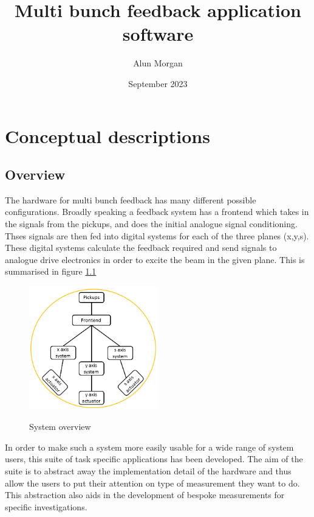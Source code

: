 \documentclass{report}
\newcommand{\docTitle}{Multi bunch feedback application software}
\begin{document}
\title{\docTitle}
\author{Alun Morgan}
\date{September 2023}

\maketitle

\tableofcontents
\clearpage
\chapter{Conceptual descriptions}
\section{Overview}
The hardware for multi bunch feedback has many different possible configurations. Broadly speaking a feedback system has a frontend which takes in the signals from the pickups, and does the initial analogue signal conditioning. Thses signals are then fed into digital systems for each of the three planes (x,y,s). These digital systems calculate the feedback required and send signals to analogue drive electronics in order to excite the beam in the given plane. This is summarised in figure \ref{system_overview}

\begin{figure}[hbt]
\begin{center}
  \includegraphics[width=0.5\textwidth]{top_level_system_overview.png}\\
  \caption{System overview}\label{system_overview}
\end{center}
\end{figure}

In order to make such a system more easily usable for a wide range of system users, this suite of task specific applications has been developed. The aim of the suite is to abstract away the implementation detail of the hardware and thus allow the users to put their attention on type of measurement they want to do. This abstraction also aids in the development of bespoke measurements for specific investigations.
\end{document}
